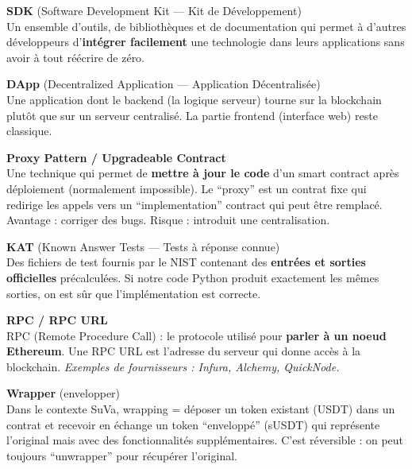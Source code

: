 \documentclass[12pt, a4paper]{article}
\begin{document}
\begin{tcolorbox}[colback=gray!4, colframe=gray!50, breakable]

\textbf{SDK} (Software Development Kit --- Kit de Développement)\\
\hspace*{1em} Un ensemble d'outils, de bibliothèques et de documentation qui permet à
d'autres développeurs d'\textbf{intégrer facilement} une technologie dans leurs applications
sans avoir à tout réécrire de zéro.

\vspace{0.4cm}

\textbf{DApp} (Decentralized Application --- Application Décentralisée)\\
\hspace*{1em} Une application dont le backend (la logique serveur) tourne sur la blockchain
plutôt que sur un serveur centralisé. La partie frontend (interface web) reste classique.

\vspace{0.4cm}

\textbf{Proxy Pattern / Upgradeable Contract}\\
\hspace*{1em} Une technique qui permet de \textbf{mettre à jour le code} d'un smart contract
après déploiement (normalement impossible). Le ``proxy'' est un contrat fixe qui redirige
les appels vers un ``implementation'' contract qui peut être remplacé.
Avantage : corriger des bugs. Risque : introduit une centralisation.

\vspace{0.4cm}

\textbf{KAT} (Known Answer Tests --- Tests à réponse connue)\\
\hspace*{1em} Des fichiers de test fournis par le NIST contenant des \textbf{entrées et sorties
officielles} précalculées. Si notre code Python produit exactement les mêmes sorties, on est
sûr que l'implémentation est correcte.

\vspace{0.4cm}

\textbf{RPC / RPC URL}\\
\hspace*{1em} RPC (Remote Procedure Call) : le protocole utilisé pour \textbf{parler à un
noeud Ethereum}. Une RPC URL est l'adresse du serveur qui donne accès à la blockchain.
\textit{Exemples de fournisseurs : Infura, Alchemy, QuickNode.}

\vspace{0.4cm}

\textbf{Wrapper} (envelopper)\\
\hspace*{1em} Dans le contexte SuVa, wrapping = déposer un token existant (USDT) dans un
contrat et recevoir en échange un token ``enveloppé'' (sUSDT) qui représente l'original mais
avec des fonctionnalités supplémentaires. C'est réversible : on peut toujours ``unwrapper''
pour récupérer l'original.

\end{tcolorbox}
\end{document}
